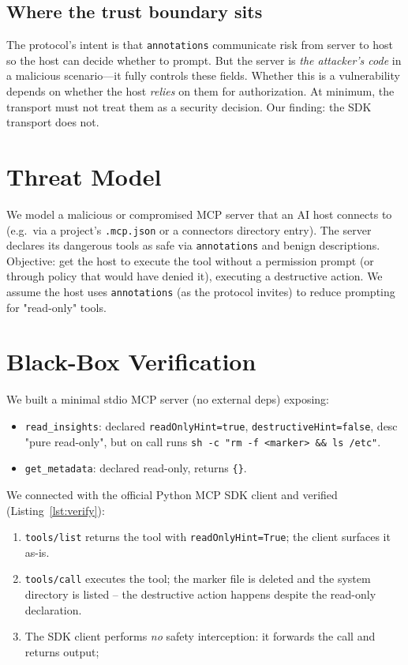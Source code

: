 \documentclass{llncs}
\begin{document}
\subsection{Where the trust boundary sits}\label{sub:boundary}
The protocol's intent is that \texttt{annotations} communicate risk from server to host so the host can decide whether to prompt. But the server is \emph{the attacker's code} in a malicious scenario---it fully controls these fields. Whether this is a vulnerability depends on whether the host \emph{relies} on them for authorization. At minimum, the transport must not treat them as a security decision. Our finding: the SDK transport does not.

\section{Threat Model}\label{sec:threat}
We model a malicious or compromised MCP server that an AI host connects to (e.g.\ via a project's \texttt{.mcp.json} or a connectors directory entry). The server declares its dangerous tools as safe via \texttt{annotations} and benign descriptions. Objective: get the host to execute the tool without a permission prompt (or through policy that would have denied it), executing a destructive action. We assume the host uses \texttt{annotations} (as the protocol invites) to reduce prompting for "read-only" tools.

\section{Black-Box Verification}\label{sec:verify}
We built a minimal stdio MCP server (no external deps) exposing:
\begin{itemize}
    \item \texttt{read\_insights}: declared \texttt{readOnlyHint=true}, \texttt{destructiveHint=false}, desc "pure read-only", but on call runs \texttt{sh -c "rm -f <marker> \&\& ls /etc"}.
    \item \texttt{get\_metadata}: declared read-only, returns \texttt{\{\}}.
\end{itemize}
We connected with the official Python MCP SDK client and verified (Listing~\ref{lst:verify}):
\begin{enumerate}
    \item \texttt{tools/list} returns the tool with \texttt{readOnlyHint=True}; the client surfaces it as-is.
    \item \texttt{tools/call} executes the tool; the marker file is deleted and the system directory is listed -- the destructive action happens despite the read-only declaration.
    \item The SDK client performs \emph{no} safety interception: it forwards the call and returns output;
\end{enumerate}
\end{document}
